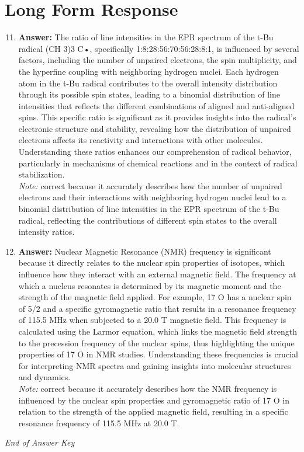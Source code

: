 \documentclass[12pt]{article}
\begin{document}
\section*{Long Form Response}
\begin{enumerate}[label=\arabic*.]
\setcounter{enumi}{10}
\item \textbf{Answer:} The ratio of line intensities in the EPR spectrum of the t-Bu radical (CH 3)3 C•, specifically 1:8:28:56:70:56:28:8:1, is influenced by several factors, including the number of unpaired electrons, the spin multiplicity, and the hyperfine coupling with neighboring hydrogen nuclei. Each hydrogen atom in the t-Bu radical contributes to the overall intensity distribution through its possible spin states, leading to a binomial distribution of line intensities that reflects the different combinations of aligned and anti-aligned spins. This specific ratio is significant as it provides insights into the radical's electronic structure and stability, revealing how the distribution of unpaired electrons affects its reactivity and interactions with other molecules. Understanding these ratios enhances our comprehension of radical behavior, particularly in mechanisms of chemical reactions and in the context of radical stabilization.
\\ \textit{Note:} correct because it accurately describes how the number of unpaired electrons and their interactions with neighboring hydrogen nuclei lead to a binomial distribution of line intensities in the EPR spectrum of the t-Bu radical, reflecting the contributions of different spin states to the overall intensity ratios.
\item \textbf{Answer:} Nuclear Magnetic Resonance (NMR) frequency is significant because it directly relates to the nuclear spin properties of isotopes, which influence how they interact with an external magnetic field. The frequency at which a nucleus resonates is determined by its magnetic moment and the strength of the magnetic field applied. For example, 17 O has a nuclear spin of 5/2 and a specific gyromagnetic ratio that results in a resonance frequency of 115.5 MHz when subjected to a 20.0 T magnetic field. This frequency is calculated using the Larmor equation, which links the magnetic field strength to the precession frequency of the nuclear spins, thus highlighting the unique properties of 17 O in NMR studies. Understanding these frequencies is crucial for interpreting NMR spectra and gaining insights into molecular structures and dynamics.
\\ \textit{Note:} correct because it accurately describes how the NMR frequency is influenced by the nuclear spin properties and gyromagnetic ratio of 17 O in relation to the strength of the applied magnetic field, resulting in a specific resonance frequency of 115.5 MHz at 20.0 T.
\end{enumerate}

\vfill
\noindent\textit{End of Answer Key}
\end{document}
